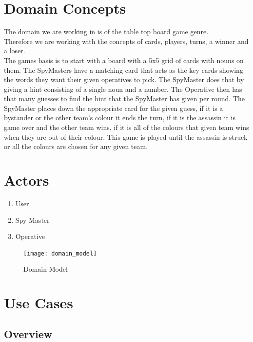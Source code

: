 \documentclass[12pt]{article}
\begin{document}
\section{Domain Concepts}
The domain we are working in is of the table top board game genre.\\
Therefore we are working with the concepts of cards, players, turns, a winner and a loser.\\
The games basis is to start with a board with a 5x5 grid of cards with nouns on them. The SpyMasters have a matching card that acts as the key cards showing the words they want their given operatives to pick. The SpyMaster does that by giving a hint consisting of a single noun and a number. The Operative then has that many guesses to find the hint that the SpyMaster has given per round. The SpyMaster places down the appropriate card for the given guess, if it is a bystander or the other team's colour it ends the turn, if it is the assassin it is game over and the other team wins, if it is all of the colours that given team wins when they are out of their colour. This game is played until the assassin is struck or all the colours are chosen for any given team.

\section{Actors}
\begin{enumerate}
\item User
\item Spy Master
\item Operative
\end{enumerate}
\newpage
\begin{figure}[htbp]
\centering
\texttt{[image: domain\_model]}
\caption{Domain Model}
\label{fig:domain-model-diagram}

\end{figure}
\newpage
\section{Use Cases}

\subsection{Overview}

\end{document}

